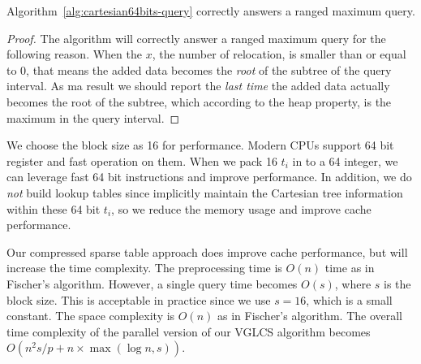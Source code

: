 

\begin{theorem} \label{thm:correctness}
  Algorithm~\ref{alg:cartesian64bits-query} correctly answers a ranged
  maximum query.
\end{theorem}
\begin{proof}
The algorithm will correctly answer a ranged maximum query for the
following reason.  When the $x$, the number of relocation, is smaller
than or equal to 0, that means the added data becomes the {\em root} of
the subtree of the query interval.  As ma result we should report the
{\em last time} the added data actually becomes the root of the
subtree, which according to the heap property, is the maximum in the
query interval.
\end{proof}

We choose the block size as 16 for performance.  Modern CPUs support
64 bit register and fast operation on them.  When we pack 16 $t_i$ in
to a 64 integer, we can leverage fast 64 bit instructions and improve
performance.  In addition, we do {\em not} build lookup tables since
implicitly maintain the Cartesian tree information within these 64
bit $t_i$, so we reduce the memory usage and improve cache
performance.

Our compressed sparse table approach does improve cache performance,
but will increase the time complexity.  The preprocessing time is
$O(n)$ time as in Fischer's algorithm.  However, a single query time
becomes $O(s)$, where $s$ is the block size.  This is acceptable in
practice since we use $s = 16$, which is a small constant.  The space
complexity is $O(n)$ as in Fischer's algorithm.  The overall time
complexity of the parallel version of our VGLCS algorithm becomes
$O(n^2 s / p + n \times \max(\log n, s))$.

